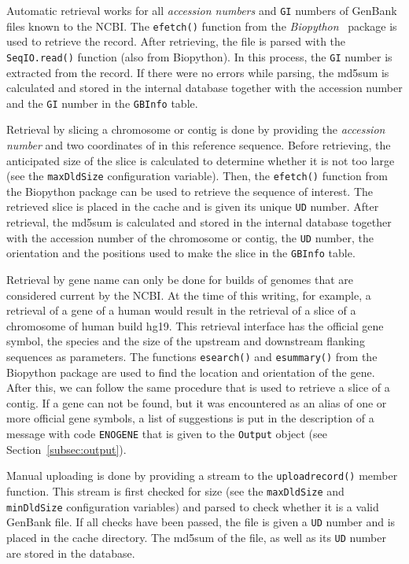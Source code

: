 \documentclass{article}
\begin{document}
Automatic retrieval works for all \emph{accession numbers} and \texttt{GI}
numbers of GenBank files known to the NCBI. The \texttt{efetch()} function from
the \emph{Biopython}~\cite{BIOPYTHON} package is used to retrieve the record.
After retrieving, the file is parsed with the \texttt{SeqIO.read()} function
(also from Biopython). In this process, the \texttt{GI} number is extracted
from the record. If there were no errors while parsing, the md5sum is
calculated and stored in the internal database together with the accession
number and the \texttt{GI} number in the \texttt{GBInfo} table.

Retrieval by slicing a chromosome or contig is done by providing the
\emph{accession number} and two coordinates of in this reference sequence.
Before retrieving, the anticipated size of the slice is calculated to determine
whether it is not too large (see the \texttt{maxDldSize} configuration
variable). Then, the \texttt{efetch()} function from the Biopython package can
be used to retrieve the sequence of interest. The retrieved slice is placed in
the cache and is given its unique \texttt{UD} number. After retrieval, the
md5sum is calculated and stored in the internal database together with the
accession number of the chromosome or contig, the \texttt{UD} number, the 
orientation and the positions used to make the slice in the \texttt{GBInfo}
table. 

Retrieval by gene name can only be done for builds of genomes that are
considered current by the NCBI. At the time of this writing, for example, a
retrieval of a gene of a human would result in the retrieval of a slice of a
chromosome of human build hg19. This retrieval interface has the official
gene symbol, the species and the size of the upstream and downstream flanking
sequences as parameters. The functions \texttt{esearch()} and
\texttt{esummary()} from the Biopython package are used to find the location
and orientation of the gene. After this, we can follow the same procedure that
is used to retrieve a slice of a contig. If a gene can not be found, but it was
encountered as an alias of one or more official gene symbols, a list of
suggestions is put in the description of a message with code \texttt{ENOGENE}
that is given to the \texttt{Output} object (see Section~\ref{subsec:output}).

Manual uploading is done by providing a stream to the \texttt{uploadrecord()}
member function. This stream is first checked for size (see the
\texttt{maxDldSize} and \texttt{minDldSize} configuration variables) and parsed
to check whether it is a valid GenBank file. If all checks have been passed,
the file is given a \texttt{UD} number and is placed in the cache directory.
The md5sum of the file, as well as its \texttt{UD} number are stored in the
database.
\end{document}
